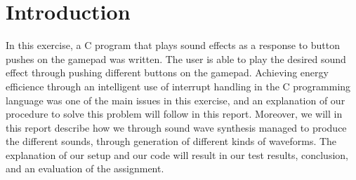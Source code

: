 \section{Introduction}

In this exercise, a C program that plays sound effects as a response to button pushes on the gamepad was written. 
The user is able to play the desired sound effect through pushing different buttons on the gamepad.
Achieving energy efficience through an intelligent use of interrupt handling in the C programming language was one of the main issues in this exercise, and an explanation of our procedure to solve this problem will follow in this report.
Moreover, we will in this report describe how we through sound wave synthesis managed to produce the different sounds, through generation of different kinds of waveforms.
The explanation of our setup and our code will result in our test results, conclusion, and an evaluation of the assignment.